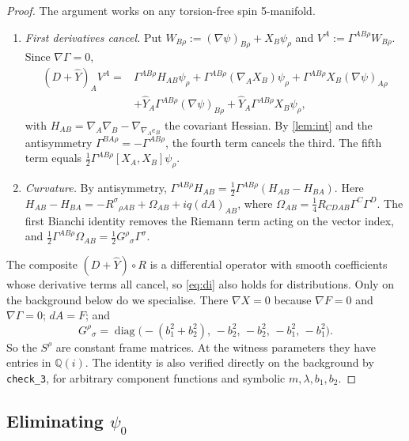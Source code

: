 \documentclass[11pt]{article}
\theoremstyle{plain}
\theoremstyle{definition}
\theoremstyle{remark}
\newcommand{\Q}{\mathbb{Q}}
\begin{document}
\begin{proof}
The argument works on any torsion-free spin 5-manifold.
\begin{enumerate}[label=(\roman*)]
  \item \emph{First derivatives cancel.} Put $W_{B\rho} := (\nabla\psi)_{B\rho} + X_B\psi_\rho$ and $V^A := \Gamma^{AB\rho}W_{B\rho}$. Since $\nabla\Gamma = 0$,
  \[
    \begin{aligned}(D+\hat Y)_AV^A = {}&\Gamma^{AB\rho}H_{AB}\psi_\rho + \Gamma^{AB\rho}(\nabla_AX_B)\psi_\rho + \Gamma^{AB\rho}X_B(\nabla\psi)_{A\rho}\\ &+ \hat Y_A\Gamma^{AB\rho}(\nabla\psi)_{B\rho} + \hat Y_A\Gamma^{AB\rho}X_B\psi_\rho ,\end{aligned}
  \]
  with $H_{AB} = \nabla_A\nabla_B - \nabla_{\nabla_Ae_B}$ the covariant Hessian. By \cref{lem:int} and the antisymmetry $\Gamma^{BA\rho} = -\Gamma^{AB\rho}$, the fourth term cancels the third. The fifth term equals $\tfrac12\Gamma^{AB\rho}[X_A,X_B]\psi_\rho$.
  \item \emph{Curvature.} By antisymmetry, $\Gamma^{AB\rho}H_{AB} = \tfrac12\Gamma^{AB\rho}(H_{AB} - H_{BA})$. Here $H_{AB} - H_{BA} = -R^{\sigma}{}_{\rho AB} + \Omega_{AB} + iq(dA)_{AB}$, where $\Omega_{AB} = \tfrac14 R_{CDAB}\Gamma^C\Gamma^D$. The first Bianchi identity removes the Riemann term acting on the vector index, and $\tfrac12\Gamma^{AB\rho}\Omega_{AB} = \tfrac12 G^{\rho}{}_{\sigma}\Gamma^\sigma$.
\end{enumerate}
The composite $(D+\hat Y)\circ R$ is a differential operator with smooth coefficients whose derivative terms all cancel, so \eqref{eq:di} also holds for distributions. Only on the background below do we specialise. There $\nabla X = 0$ because $\nabla F = 0$ and $\nabla\Gamma = 0$; $dA = F$; and
\[
  G^{\rho}{}_{\sigma} = \operatorname{diag}\bigl(-(b_1^2+b_2^2),\,-b_2^2,\,-b_2^2,\,-b_1^2,\,-b_1^2\bigr).
\]
So the $S^\rho$ are constant frame matrices. At the witness parameters they have entries in $\Q(i)$. The identity is also verified directly on the background by \texttt{check\_3}, for arbitrary component functions and symbolic $m,\lambda,b_1,b_2$.
\end{proof}

\subsection{Eliminating \texorpdfstring{$\psi_0$}{psi\_0}}\label{sec:elim}
\end{document}
